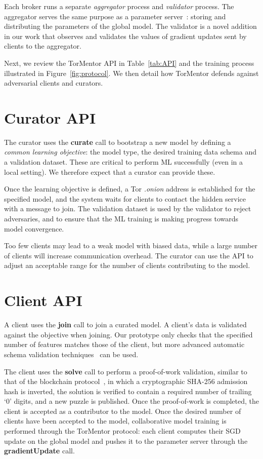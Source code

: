 Each broker runs a separate \emph{aggregator} process and 
\emph{validator} process. The aggregator serves the same purpose as a
parameter server~\cite{Li:2014}: storing and distributing the
parameters of the global model. The validator is a novel addition in
our work that observes and validates the values of gradient updates
sent by clients to the aggregator.

Next, we review the TorMentor API in Table~\ref{tab:API} and the
training process illustrated in Figure~\ref{fig:protocol}. We then
detail how TorMentor defends against adversarial clients and curators.

\section{Curator API}

The curator uses the \textbf{curate} call to bootstrap a new model by defining
a \emph{common learning objective}: the model type, the desired
training data schema and a validation dataset. These are critical to
perform ML successfully (even in a local setting). We therefore expect
that a curator can provide these.

Once the learning objective is defined, a Tor \textit{.onion} address
is established for the specified model, and the system waits for
clients to contact the hidden service with a message to join. The
validation dataset is used by the validator to reject adversaries, and
to ensure that the ML training is making progress towards model
convergence.

Too few clients may lead to a weak model with biased data, while a
large number of clients will increase communication overhead. The
curator can use the API to adjust an acceptable range for the number of
clients contributing to the model.

\section{Client API} 

A client uses the \textbf{join} call to join a curated model. A
client's data is validated against the objective when joining. Our
prototype only checks that the specified number of features matches
those of the client, but more advanced automatic schema validation
techniques~\cite{Rahm:2001} can be used.

The client uses the \textbf{solve} call to perform a proof-of-work
validation, similar to that of the blockchain 
protocol~\cite{Nakamoto:2009}, in which a cryptographic SHA-256
admission hash is inverted, the solution is verified to contain
a required number of trailing `0' digits, and a new puzzle is
published. Once the proof-of-work is completed, the client is accepted
as a contributor to the model. Once the desired number of clients have
been accepted to the model, collaborative model training is performed
through the TorMentor protocol: each client computes their SGD update
on the global model and pushes it to the parameter server through the 
\textbf{gradientUpdate} call.

